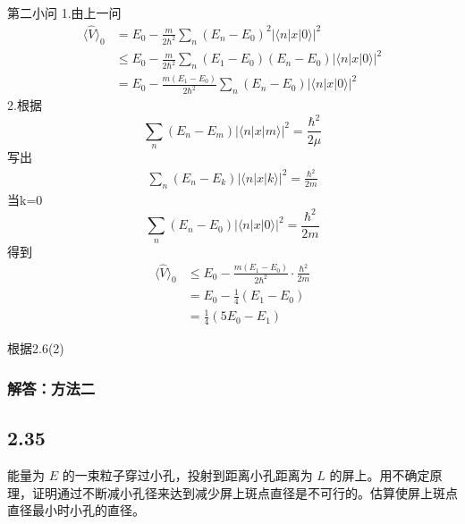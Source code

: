 第二小问
1.由上一问
\begin{equation}
    \begin{aligned}
        \langle \hat{V}\rangle _0&=E_0-\frac{m}{2\hbar ^2}\sum_n{\left( E_n-E_0 \right) ^2}\left| \langle n|x|0\rangle \right|^2
\\
&\leqslant E_0-\frac{m}{2\hbar ^2}\sum_n{\left( E_1-E_0 \right) \left( E_n-E_0 \right)}\left| \langle n|x|0\rangle \right|^2
\\
&=E_0-\frac{m\left( E_1-E_0 \right)}{2\hbar ^2}\sum_n{\left( E_n-E_0 \right)}\left| \langle n|x|0\rangle \right|^2
    \end{aligned}
\end{equation}
2.根据
\begin{equation}
    \sum_n{\left( E_n-E_m \right) \left| \langle n|x|m\rangle \right|^2}=\frac{\hbar ^2}{2\mu}
\end{equation}
写出
\begin{equation}
    \begin{aligned}
        \sum_n{\left( E_n-E_k \right) \left| \langle n|x|k\rangle \right|^2}=\frac{\hbar ^2}{2m}
    \end{aligned}
\end{equation}
当k=0
\begin{equation}
    \sum_n{\left( E_n-E_0 \right) \left| \langle n|x|0\rangle \right|^2}=\frac{\hbar ^2}{2m}
\end{equation}
得到
\begin{equation}
    \begin{aligned}
        \langle \hat{V}\rangle _0 &\leqslant E_0-\frac{m\left( E_1-E_0 \right)}{2\hbar ^2}\cdot \frac{\hbar ^2}{2m}
\\
&=E_0-\frac{1}{4}\left( E_1-E_0 \right) 
\\
&=\frac{1}{4}\left( 5E_0-E_1 \right) 
    \end{aligned}
\end{equation}



根据2.6(2)




\subsubsection{解答：方法二}




\newpage
\subsection{2.35}
能量为 $E$ 的一束粒子穿过小孔，投射到距离小孔距离为 $L$ 的屏上。用不确定原理，证明通过不断减小孔径来达到减少屏上斑点直径是不可行的。估算使屏上斑点直径最小时小孔的直径。

